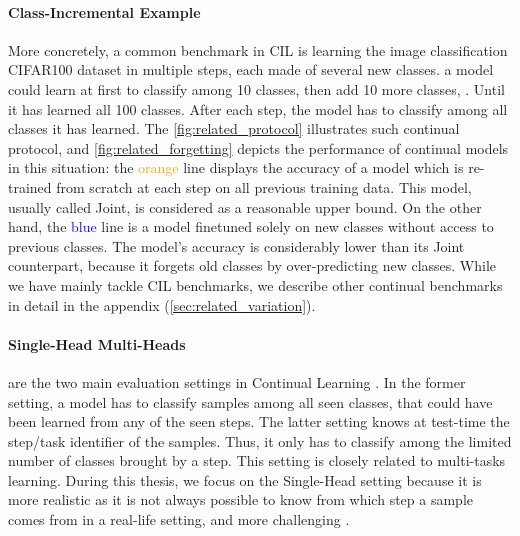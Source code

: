 \paragraph{Class-Incremental Example} More concretely, a common benchmark in \acf{CIL} is learning
the image classification CIFAR100 dataset \citep{krizhevskycifar100} in multiple steps, each made of
several new classes. \eg a model could learn at first to classify among 10 classes, then add 10 more
classes, \etc. Until it has learned all 100 classes. After each step, the model has to classify
among all classes it has learned. The \autoref{fig:related_protocol} illustrates such continual
protocol, and \autoref{fig:related_forgetting} depicts the performance of continual models in this
situation: the \textcolor{orange}{orange} line displays the accuracy of a model which is re-trained
from scratch at each step on all previous training data. This model, usually called Joint, is
considered as a reasonable upper bound. On the other hand, the \textcolor{blue}{blue} line is a
model finetuned solely on new classes without access to previous classes. The model's accuracy is
considerably lower than its Joint counterpart, because it forgets old classes by over-predicting new
classes. While we have mainly tackle \acf{CIL} benchmarks, we describe other continual benchmarks in
detail in the appendix (\autoref{sec:related_variation}).

\paragraph{Single-Head \vs Multi-Heads} are the two main evaluation settings in Continual Learning
\citep{chaudhry2018riemannien_walk}. In the former setting, a model has to classify samples among
all seen classes, that could have been learned from any of the seen steps. The latter setting knows
at test-time the step/task identifier of the samples. Thus, it only has to classify among the limited
number of classes brought by a step. This setting is closely related to multi-tasks learning. During
this thesis, we focus on the Single-Head setting because it is more realistic as it is not always
possible to know from which step a sample comes from in a real-life setting, and more challenging
\citep{lesort2019regulshortcomings}.

